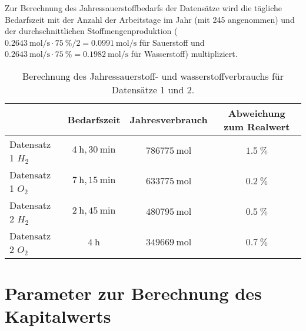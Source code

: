 Zur Berechnung des Jahressauerstoffbedarfs der Datensätze wird die tägliche Bedarfszeit mit der Anzahl der Arbeitstage im Jahr (mit 245 angenommen) und der durchschnittlichen Stoffmengenproduktion ($\SI{0,2643}{\mol\per\s} \cdot \SI{75}{\%} / 2 = \SI{0,0991}{\mol\per\s}$ für Sauerstoff und $\SI{0,2643}{\mol\per\s} \cdot \SI{75}{\%} = \SI{0,1982}{\mol\per\s}$ für Wasserstoff) multipliziert. 

\begin{table}[ht]
		\centering
		\caption{Berechnung des Jahressauerstoff- und wasserstoffverbrauchs für Datensätze 1 und 2.}
		\begin{tabular}{l c c c}
		\toprule
		 & Bedarfszeit & Jahresverbrauch & Abweichung zum Realwert\\
		\midrule
		Datensatz 1 $H_2$ & $\SI{4}{\hour},\SI{30}{\minute}$ & $\SI{786775}{\mol}$ & $\SI{1,5}{\%}$\\
		Datensatz 1 $O_2$ & $\SI{7}{\hour},\SI{15}{\minute}$ & $\SI{633775}{\mol}$ & $\SI{0,2}{\%}$\\
		Datensatz 2 $H_2$ & $\SI{2}{\hour},\SI{45}{\minute}$ & $\SI{480795}{\mol}$ & $\SI{0,5}{\%}$\\
		Datensatz 2 $O_2$ & $\SI{4}{\hour}$ & $ \SI{349669}{\mol}$ & $\SI{0,7}{\%}$\\
		\bottomrule
		\end{tabular}
		\label{tb:VerbrauchSimulation}
\end{table}	

\chapter{Parameter zur Berechnung des Kapitalwerts}
\label{Apx:Kapitalwert}

